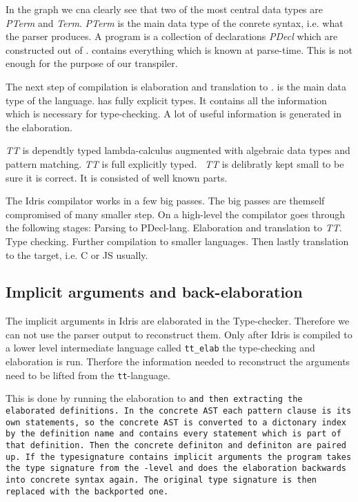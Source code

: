 In the graph we cna clearly see that two of the most central data types are
\textit{PTerm} and \textit{Term}. \textit{PTerm} is the main data type of the
conrete syntax, i.e. what the parser produces. A program is a collection of
declarations \textit{PDecl} which are constructed out of \pterm. \pterm
contains everything which is known at parse-time. This is not enough for the
purpose of our transpiler.

The next step of compilation is elaboration and translation to \tti. \term is
the main data type of the \tti language. \tti has fully explicit types. It
contains all the information which is necessary for type-checking. A lot of
useful information is generated in the elaboration.

\textit{TT} is dependtly typed lambda-calculus augmented with algebraic data
types and pattern matching. \textit{TT} is full explicitly typed.~\cite{idris}
\textit{TT} is delibratly kept small to be sure it is correct. It is consisted
of well known parts.

The Idris compilator works in a few big passes. The big passes are themself
compromised of many smaller step. On a high-level the compilator goes through
the following stages: Parsing to PDecl-lang. Elaboration and translation to
\textit{TT}. Type checking. Further compilation to smaller languages. Then
lastly translation to the target, i.e. C or JS usually.

\subsection{Implicit arguments and back-elaboration}
The implicit arguments in Idris are elaborated in the Type-checker. Therefore
we can not use the parser output to reconstruct them.  Only after Idris is
compiled to a lower level intermediate language called \texttt{tt\_elab} the
type-checking and elaboration is run. Therfore the information needed to
reconstruct the arguments need to be lifted from the \texttt{tt}-language.

This is done by running the elaboration to \tt and then extracting the
elaborated definitions. In the concrete AST each pattern clause is its own
statements, so the concrete AST is converted to a dictonary index by the
definition name and contains every statement which is part of that definition.
Then the concrete definiton and \tt definiton are paired up. If the
typesignature contains implicit arguments the program takes the type signature
from the \tt-level and does the elaboration backwards into concrete syntax
again. The original type signature is then replaced with the backported one.


